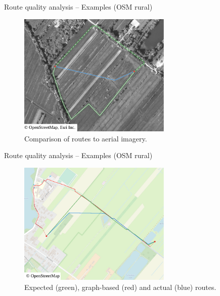 \documentclass[xcolor={x11names}]{beamer}
\newenvironment{figcenter}
{%
	\parskip=0pt%
	\par%
	\nopagebreak%
	\centering%
}%
{%
	\par%
	\noindent%
	\ignorespacesafterend%
}
\begin{document}
	\begin{frame}{Route quality analysis -- Examples (OSM rural)}
		\begin{figure}
			\begin{figcenter}
				\includegraphics[width=0.65\textwidth]{../thesis/images/qgis-routing-rural-routing-6-aerial.pdf}
			\end{figcenter}
			\caption{Comparison of routes to aerial imagery.}
		\end{figure}
	\end{frame}
	
	\begin{frame}{Route quality analysis -- Examples (OSM rural)}
		\begin{figure}
			\begin{figcenter}
				\includegraphics[width=0.65\textwidth]{../thesis/images/qgis-routing-rural-routing-17-graph-based.pdf}
			\end{figcenter}
			\caption{Expected (green), graph-based (red) and actual (blue) routes.}
		\end{figure}
	\end{frame}
	
\end{document}

